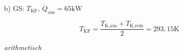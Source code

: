 b) GS: $T_{\text{KF}}$, $\dot{Q}_{\text{aus}} = 65 \text{kW}$

\[
T_{\text{KF}} = \frac{T_{\text{K,aus}} + T_{\text{K,rein}}}{2} = 293,15 \text{K}
\]

\textit{arithmetisch}